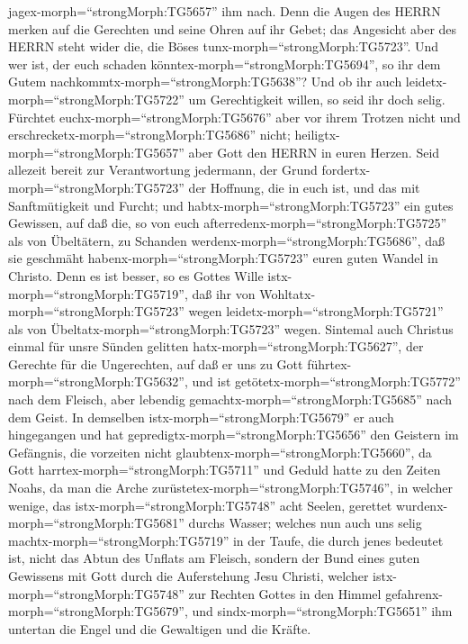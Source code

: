 jagex-morph=``strongMorph:TG5657'' ihm nach.  Denn die
Augen des HERRN merken auf die Gerechten und seine Ohren auf ihr Gebet;
das Angesicht aber des HERRN steht wider die, die Böses
tunx-morph=``strongMorph:TG5723''.  Und wer ist, der euch
schaden könntex-morph=``strongMorph:TG5694'', so ihr dem Gutem
nachkommtx-morph=``strongMorph:TG5638''?  Und ob ihr auch
leidetx-morph=``strongMorph:TG5722'' um Gerechtigkeit willen, so seid
ihr doch selig. Fürchtet euchx-morph=``strongMorph:TG5676'' aber vor
ihrem Trotzen nicht und erschrecketx-morph=``strongMorph:TG5686'' nicht;
 heiligtx-morph=``strongMorph:TG5657'' aber Gott den HERRN
in euren Herzen. Seid allezeit bereit zur Verantwortung jedermann, der
Grund fordertx-morph=``strongMorph:TG5723'' der Hoffnung, die in euch
ist,  und das mit Sanftmütigkeit und Furcht; und
habtx-morph=``strongMorph:TG5723'' ein gutes Gewissen, auf daß die, so
von euch afterredenx-morph=``strongMorph:TG5725'' als von Übeltätern, zu
Schanden werdenx-morph=``strongMorph:TG5686'', daß sie geschmäht
habenx-morph=``strongMorph:TG5723'' euren guten Wandel in Christo.
 Denn es ist besser, so es Gottes Wille
istx-morph=``strongMorph:TG5719'', daß ihr von
Wohltatx-morph=``strongMorph:TG5723'' wegen
leidetx-morph=``strongMorph:TG5721'' als von
Übeltatx-morph=``strongMorph:TG5723'' wegen.  Sintemal auch
Christus einmal für unsre Sünden gelitten
hatx-morph=``strongMorph:TG5627'', der Gerechte für die Ungerechten, auf
daß er uns zu Gott führtex-morph=``strongMorph:TG5632'', und ist
getötetx-morph=``strongMorph:TG5772'' nach dem Fleisch, aber lebendig
gemachtx-morph=``strongMorph:TG5685'' nach dem Geist.  In
demselben istx-morph=``strongMorph:TG5679'' er auch hingegangen und hat
gepredigtx-morph=``strongMorph:TG5656'' den Geistern im Gefängnis,
 die vorzeiten nicht
glaubtenx-morph=``strongMorph:TG5660'', da Gott
harrtex-morph=``strongMorph:TG5711'' und Geduld hatte zu den Zeiten
Noahs, da man die Arche zurüstetex-morph=``strongMorph:TG5746'', in
welcher wenige, das istx-morph=``strongMorph:TG5748'' acht Seelen,
gerettet wurdenx-morph=``strongMorph:TG5681'' durchs Wasser;
 welches nun auch uns selig
machtx-morph=``strongMorph:TG5719'' in der Taufe, die durch jenes
bedeutet ist, nicht das Abtun des Unflats am Fleisch, sondern der Bund
eines guten Gewissens mit Gott durch die Auferstehung Jesu Christi,
 welcher istx-morph=``strongMorph:TG5748'' zur Rechten
Gottes in den Himmel gefahrenx-morph=``strongMorph:TG5679'', und
sindx-morph=``strongMorph:TG5651'' ihm untertan die Engel und die
Gewaltigen und die Kräfte.

